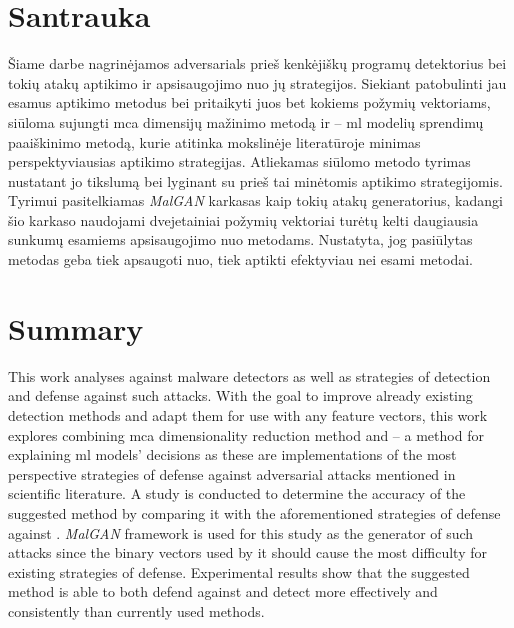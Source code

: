 \section*{Santrauka}

Šiame darbe nagrinėjamos \glspl{adversarial} prieš kenkėjiškų programų detektorius bei tokių atakų aptikimo ir apsisaugojimo nuo jų strategijos. Siekiant patobulinti jau esamus aptikimo metodus bei pritaikyti juos bet kokiems požymių vektoriams, siūloma sujungti \gls{mca} dimensijų mažinimo metodą ir \LIME -- \gls{ml} modelių sprendimų paaiškinimo metodą, kurie atitinka mokslinėje literatūroje minimas perspektyviausias  aptikimo strategijas. Atliekamas siūlomo metodo tyrimas nustatant jo tikslumą bei lyginant su prieš tai minėtomis  aptikimo strategijomis. Tyrimui pasitelkiamas \textit{MalGAN} karkasas kaip tokių atakų generatorius, kadangi šio karkaso naudojami dvejetainiai požymių vektoriai turėtų kelti daugiausia sunkumų esamiems apsisaugojimo nuo  metodams. Nustatyta, jog pasiūlytas metodas geba tiek apsaugoti nuo, tiek aptikti  efektyviau nei esami metodai. 

\clearpage
\section*{Summary}

This work analyses  against malware detectors as well as strategies of detection and defense against such attacks. With the goal to improve already existing detection methods and adapt them for use with any feature vectors, this work explores combining \gls{mca} dimensionality reduction method and \LIME -- a method for explaining \gls{ml} models' decisions as these are implementations of the most perspective strategies of defense against adversarial attacks mentioned in scientific literature. A study is conducted to determine the accuracy of the suggested method by comparing it with the aforementioned strategies of defense against . \textit{MalGAN} framework is used for this study as the generator of such attacks since the binary vectors used by it should cause the most difficulty for existing strategies of defense. Experimental results show that the suggested method is able to both defend against and detect  more effectively and consistently than currently used methods.
